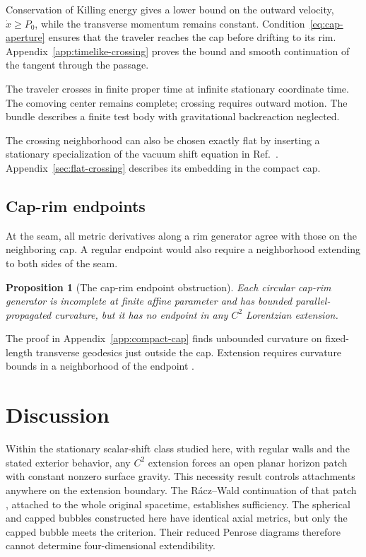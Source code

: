 \documentclass[10pt]{article}
\newtheorem{proposition}[theorem]{Proposition}
\begin{document}
Conservation of Killing energy gives a lower bound on the outward velocity,
\(\dot x\geq P_0\), while the transverse momentum remains constant.
Condition~\eqref{eq:cap-aperture} ensures that the traveler reaches the
cap before drifting to its rim.  Appendix~\ref{app:timelike-crossing}
proves the bound and smooth continuation of the tangent through the passage.

The traveler crosses in finite proper time at infinite stationary coordinate
time.  The comoving center remains complete; crossing requires outward motion.
The bundle describes a finite test body with gravitational backreaction
neglected.

The crossing neighborhood can also be chosen exactly flat by inserting
a stationary specialization of the vacuum shift equation in
Ref.~\cite{SantosPereiraEtAl2020}.  Appendix~\ref{sec:flat-crossing}
describes its embedding in the compact cap.

\subsection{Cap-rim endpoints}

At the seam, all metric derivatives along a rim generator agree with
those on the neighboring cap.  A regular endpoint would also require a
neighborhood extending to both sides of the seam.

\begin{proposition}[The cap-rim endpoint obstruction]
\label{prop:flat-cap-rim}
Each circular cap-rim generator is incomplete at finite affine parameter and
has bounded parallel-propagated curvature, but it has no endpoint in any
\(C^2\) Lorentzian extension.
\end{proposition}


The proof in Appendix~\ref{app:compact-cap} finds unbounded curvature on
fixed-length transverse geodesics just outside the cap.  Extension requires
curvature bounds in a neighborhood of the endpoint \cite{Racz2010}.

\section{Discussion}

Within the stationary scalar-shift class studied here, with regular walls
and the stated exterior behavior, any \(C^2\) extension forces an open
planar horizon patch with constant nonzero surface gravity.  This necessity
result controls attachments anywhere on the extension boundary.  The
R\'acz--Wald continuation of that patch
\cite{RaczWald1992,RaczWald1996}, attached to the whole original spacetime,
establishes sufficiency.
The spherical and capped bubbles constructed here have identical axial
metrics, but only the capped bubble meets the criterion.  Their reduced
Penrose diagrams therefore cannot determine four-dimensional extendibility.
\end{document}

